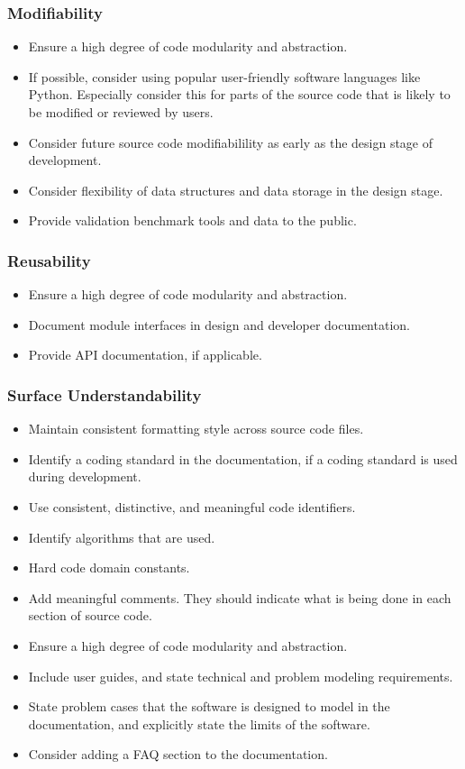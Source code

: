\documentclass[12pt, notitlepage]{article}
\begin{document}
\subsubsection{Modifiability}

\begin{itemize}
	\item Ensure a high degree of code modularity and abstraction.
	\item If possible, consider using popular user-friendly software languages like Python. Especially consider this for parts of the source code that is likely to be modified or reviewed by users.
	\item Consider future source code modifiabilility as early as the design stage of development.
	\item Consider flexibility of data structures and data storage in the design stage.
	\item Provide validation benchmark tools and data to the public.
\end{itemize}

\subsubsection{Reusability}

\begin{itemize}
	\item Ensure a high degree of code modularity and abstraction.
	\item Document module interfaces in design and developer documentation.
	\item Provide API documentation, if applicable.
\end{itemize}

\subsubsection{Surface Understandability}

\begin{itemize}
	\item Maintain consistent formatting style across source code files.
	\item Identify a coding standard in the documentation, if a coding standard is used during development.
	\item Use consistent, distinctive, and meaningful code identifiers. 
	\item Identify algorithms that are used.
	\item Hard code domain constants.
	\item Add meaningful comments. They should indicate what is being done in each section of source code.
	\item Ensure a high degree of code modularity and abstraction.
	\item Include user guides, and state technical and problem modeling requirements.
	\item State problem cases that the software is designed to model in the documentation, and explicitly state the limits of the software. 
	\item Consider adding a FAQ section to the documentation. 
\end{itemize}
\end{document}
